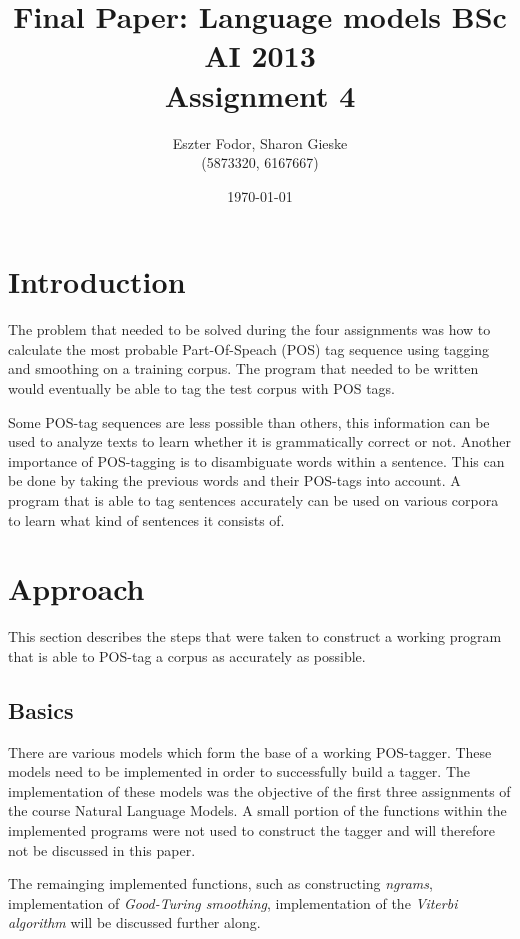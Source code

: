 \documentclass[10pt, a4paper]{article}
\title{Final Paper: Language models BSc AI 2013 \\ Assignment 4}
\author{Eszter Fodor, Sharon Gieske \\ (5873320, 6167667)}
\date{\today}
\begin{document}
\maketitle{}


\section*{Introduction}
The problem that needed to be solved during the four assignments was how to calculate the most
probable Part-Of-Speach (POS) tag sequence using tagging and smoothing on a training corpus. The
program that needed to be written would eventually be able to tag the test corpus with POS tags.

Some POS-tag sequences are less possible than others, this information can be used to analyze 
texts to learn whether it is grammatically correct or not.
Another importance of POS-tagging is to disambiguate words within a sentence. This can be done by
taking the previous words and their POS-tags into account. A program that is able to tag sentences
accurately can be used on various corpora to learn what kind of sentences it consists of. 

\section*{Approach}
This section describes the steps that were taken to construct a working program that is able to POS-tag a corpus as accurately as possible.


\subsection*{Basics}
There are various models which form the base of a working POS-tagger. These models need to be implemented in order to successfully build a tagger. The implementation of these models was the objective of the first three assignments of the course Natural Language Models. A small portion of the functions within the implemented programs were not used to construct the tagger and will therefore not be discussed in this paper.

The remainging implemented functions, such as constructing \textit{ngrams}, implementation of \textit{Good-Turing smoothing}, implementation of the \textit{Viterbi algorithm} will be discussed further along.
\end{document}
